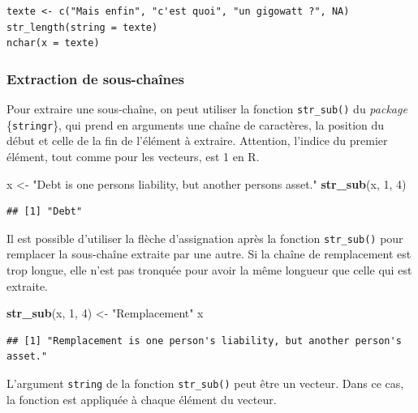 \documentclass[
  11pt,
]{book}
\newenvironment{Shaded}{\begin{snugshade}}{\end{snugshade}}
\newcommand{\DecValTok}[1]{\textcolor[rgb]{0.00,0.00,0.81}{#1}}
\newcommand{\KeywordTok}[1]{\textcolor[rgb]{0.13,0.29,0.53}{\textbf{#1}}}
\newcommand{\NormalTok}[1]{#1}
\newcommand{\StringTok}[1]{\textcolor[rgb]{0.31,0.60,0.02}{#1}}
\numberwithin{equation}{section}
\numberwithin{countremarque}{section}
\begin{document}
\begin{lstlisting}
texte <- c("Mais enfin", "c'est quoi", "un gigowatt ?", NA)
str_length(string = texte)
nchar(x = texte)
\end{lstlisting}

\hypertarget{extraction-de-sous-chauxeenes}{%
\subsubsection{Extraction de sous-chaînes}\label{extraction-de-sous-chauxeenes}}

Pour extraire une sous-chaîne, on peut utiliser la fonction \texttt{str\_sub()} du \emph{package} \{\texttt{stringr}\}, qui prend en arguments une chaîne de caractères, la position du début et celle de la fin de l'élément à extraire. Attention, l'indice du premier élément, tout comme pour les vecteurs, est 1 en R.

\begin{Shaded}
\begin{Highlighting}[]
\NormalTok{x \textless{}{-}}\StringTok{ "Debt is one person\textquotesingle{}s liability, but another person\textquotesingle{}s asset."}
\KeywordTok{str\_sub}\NormalTok{(x, }\DecValTok{1}\NormalTok{, }\DecValTok{4}\NormalTok{)}
\end{Highlighting}
\end{Shaded}

\begin{lstlisting}
## [1] "Debt"
\end{lstlisting}

Il est possible d'utiliser la flèche d'assignation après la fonction \texttt{str\_sub()} pour remplacer la sous-chaîne extraite par une autre. Si la chaîne de remplacement est trop longue, elle n'est pas tronquée pour avoir la même longueur que celle qui est extraite.

\begin{Shaded}
\begin{Highlighting}[]
\KeywordTok{str\_sub}\NormalTok{(x, }\DecValTok{1}\NormalTok{, }\DecValTok{4}\NormalTok{) \textless{}{-}}\StringTok{ "Remplacement"}
\NormalTok{x}
\end{Highlighting}
\end{Shaded}

\begin{lstlisting}
## [1] "Remplacement is one person's liability, but another person's asset."
\end{lstlisting}

L'argument \texttt{string} de la fonction \texttt{str\_sub()} peut être un vecteur. Dans ce cas, la fonction est appliquée à chaque élément du vecteur.
\end{document}
